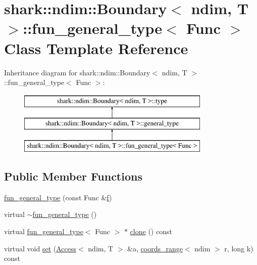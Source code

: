 \hypertarget{classshark_1_1ndim_1_1_boundary_1_1fun__general__type}{}\section{shark\+:\+:ndim\+:\+:Boundary$<$ ndim, T $>$\+:\+:fun\+\_\+general\+\_\+type$<$ Func $>$ Class Template Reference}
\label{classshark_1_1ndim_1_1_boundary_1_1fun__general__type}
Inheritance diagram for shark\+:\+:ndim\+:\+:Boundary$<$ ndim, T $>$\+:\+:fun\+\_\+general\+\_\+type$<$ Func $>$\+:\begin{figure}[H]
\begin{center}
\leavevmode
\includegraphics[height=3.000000cm]{classshark_1_1ndim_1_1_boundary_1_1fun__general__type}
\end{center}
\end{figure}
\subsection*{Public Member Functions}
\begin{DoxyCompactItemize}
\item 
\hyperlink{classshark_1_1ndim_1_1_boundary_1_1fun__general__type_af5d09f114b529e82be303a9b9896a84b}{fun\+\_\+general\+\_\+type} (const Func \&\hyperlink{classshark_1_1ndim_1_1_boundary_1_1fun__general__type_a7a2449e92b694dd4d966e17c4d999a91}{f})
\item 
virtual \hyperlink{classshark_1_1ndim_1_1_boundary_1_1fun__general__type_a05fd22999b9a79dbfecca14e1014d654}{$\sim$fun\+\_\+general\+\_\+type} ()
\item 
virtual \hyperlink{classshark_1_1ndim_1_1_boundary_1_1fun__general__type}{fun\+\_\+general\+\_\+type}$<$ Func $>$ $\ast$ \hyperlink{classshark_1_1ndim_1_1_boundary_1_1fun__general__type_a2a2ebd25aa8dcb4960c28db87680e7c6}{clone} () const
\item 
virtual void \hyperlink{classshark_1_1ndim_1_1_boundary_1_1fun__general__type_a7f5d89a026065de5a42b757ce507a70f}{set} (\hyperlink{classshark_1_1ndim_1_1_access}{Access}$<$ ndim, T $>$ \&a, \hyperlink{structshark_1_1ndim_1_1coords__range}{coords\+\_\+range}$<$ ndim $>$ r, long k) const
\end{DoxyCompactItemize}
